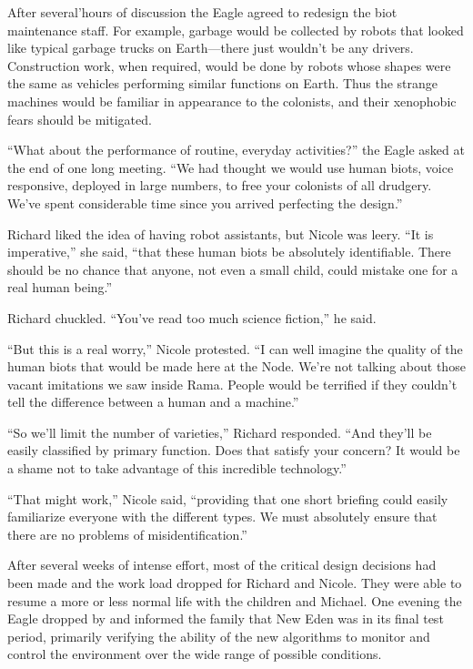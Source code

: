 \documentclass[]{article}
\begin{document}
{After several’hours of discussion the Eagle agreed to redesign the biot maintenance staff.  For example, garbage would be collected by robots that looked like typical garbage trucks on Earth—there just wouldn’t be any drivers.  Construction work, when required, would be done by robots whose shapes were the same as vehicles performing similar functions on Earth.  Thus the strange machines would be familiar in appearance to the colonists, and their xenophobic fears should be mitigated.

“What about the performance of routine, everyday activities?” the Eagle asked at the end of one long meeting.  “We had thought we would use human biots, voice responsive, deployed in large numbers, to free your colonists of all drudgery.  We’ve spent considerable time since you arrived perfecting the design.”

Richard liked the idea of having robot assistants, but Nicole was leery.  “It is imperative,” she said, “that these human biots be absolutely identifiable.  There should be no chance that anyone, not even a small child, could mistake one for a real human being.”

Richard chuckled.  “You’ve read too much science fiction,” he said.

“But this is a real worry,” Nicole protested.  “I can well imagine the quality of the human biots that would be made here at the Node.  We’re not talking about those vacant imitations we saw inside Rama.  People would be terrified if they couldn’t tell the difference between a human and a machine.”

“So we’ll limit the number of varieties,” Richard responded.  “And they’ll be easily classified by primary function.  Does that satisfy your concern? It would be a shame not to take advantage of this incredible technology.”

“That might work,” Nicole said, “providing that one short briefing could easily familiarize everyone with the different types.  We must absolutely ensure that there are no problems of misidentification.”

After several weeks of intense effort, most of the critical design decisions had been made and the work load dropped for Richard and Nicole.  They were able to resume a more or less normal life with the children and Michael.  One evening the Eagle dropped by and informed the family that New Eden was in its final test period, primarily verifying the ability of the new algorithms to monitor and control the environment over the wide range of possible conditions.

}
\end{document}

